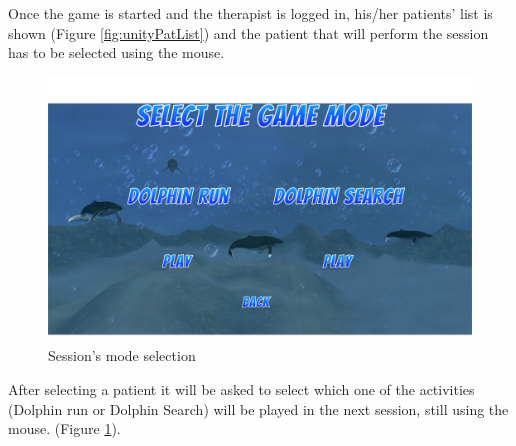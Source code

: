 Once the game is started and the therapist is logged in, his/her patients' list is shown (Figure \ref{fig:unityPatList}) and the patient that will perform the session has to be selected using the mouse.
\pagebreak
\begin{figure}[h!]
	\includegraphics[width=\textwidth]{images/UX/unity/menu/4-modeSelection}
	\caption{Session's mode selection}
	\label{fig:unityModSel}
\end{figure}

After selecting a patient it will be asked to select which one of the activities (Dolphin run or Dolphin Search) will be played in the next session, still using the mouse. (Figure \ref{fig:unityModSel}).

